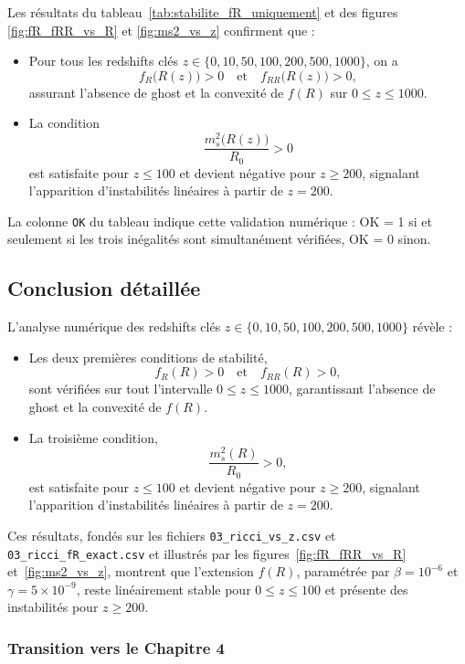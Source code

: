 Les résultats du tableau~\ref{tab:stabilite_fR_uniquement} et des figures
\ref{fig:fR_fRR_vs_R} et \ref{fig:ms2_vs_z} confirment que :

\begin{itemize}
  \item Pour tous les redshifts clés $z\in\{0,10,50,100,200,500,1000\}$, on a
    \[
      f_{R}\bigl(R(z)\bigr)>0
      \quad\text{et}\quad
      f_{RR}\bigl(R(z)\bigr)>0,
    \]
    assurant l’absence de ghost et la convexité de $f(R)$ sur $0 \le z \le 1000$.
  \item La condition
    \[
      \frac{m_{s}^{2}\bigl(R(z)\bigr)}{R_{0}}>0
    \]
    est satisfaite pour $z \le 100$ et devient négative pour $z \ge 200$, signalant l’apparition d’instabilités linéaires à partir de $z=200$.
\end{itemize}

La colonne \texttt{OK} du tableau indique cette validation numérique : OK = 1 si et seulement si les trois inégalités sont simultanément vérifiées, OK = 0 sinon.

\subsection{Conclusion détaillée}

L’analyse numérique des redshifts clés $z\in\{0,10,50,100,200,500,1000\}$ révèle :

\begin{itemize}
  \item Les deux premières conditions de stabilité,
    \[
      f_{R}(R)>0
      \quad\text{et}\quad
      f_{RR}(R)>0,
    \]
    sont vérifiées sur tout l’intervalle $0\le z\le1000$, garantissant l’absence de ghost et la convexité de $f(R)$.
  \item La troisième condition,
    \[
      \frac{m_{s}^{2}(R)}{R_{0}}>0,
    \]
    est satisfaite pour $z\le100$ et devient négative pour $z\ge200$, signalant l’apparition d’instabilités linéaires à partir de $z=200$.
\end{itemize}

Ces résultats, fondés sur les fichiers
\texttt{03\_ricci\_vs\_z.csv} et
\texttt{03\_ricci\_fR\_exact.csv} et illustrés par les figures~\ref{fig:fR_fRR_vs_R}
et~\ref{fig:ms2_vs_z},
montrent que l’extension $f(R)$, paramétrée par
$\beta=10^{-6}$ et $\gamma=5\times10^{-9}$, reste linéairement stable pour
$0\le z\le100$ et présente des instabilités pour $z\ge200$.

\subsubsection*{Transition vers le Chapitre 4}

